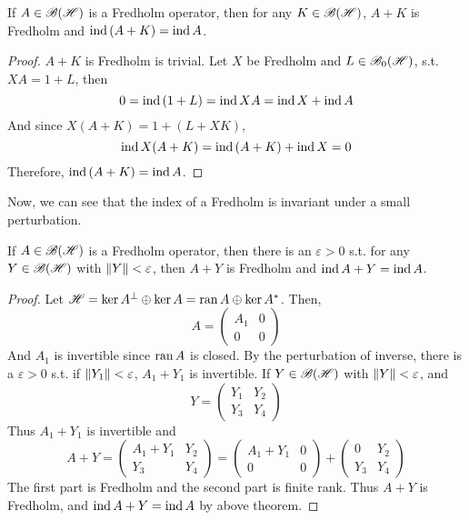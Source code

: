 \begin{thm}
	If $A \in \mathscr{B(H)}$ is a Fredholm operator, then for any $K \in \mathscr{B(H)}$, $A+K$ is Fredholm and $\operatorname{ind}{(A+K)} = \operatorname{ind}{A}$.
\end{thm}
\begin{proof}
	$A+K$ is Fredholm is trivial. Let $X$ be Fredholm and $L \in \mathscr{B}_{0}\mathscr{(H)}$, s.t. $XA = 1+L$, then
	\begin{equation*}
		0 = \operatorname{ind}{(1+L)} = \operatorname{ind}{XA} = \operatorname{ind}{X} + \operatorname{ind}{A}
	\end{equation*}
	And since $X(A+K) = 1+(L+XK)$, 
	\begin{equation*}
		\operatorname{ind}{X(A+K)} = \operatorname{ind}{(A+K)} + \operatorname{ind}{X} = 0
	\end{equation*}
	Therefore, $\operatorname{ind}{(A+K)} = \operatorname{ind}{A}$.
\end{proof}

Now, we can see that the index of a Fredholm is invariant under a small perturbation.

\begin{thm}
	If $A \in \mathscr{B(H)}$ is a Fredholm operator, then there is an $\varepsilon>0$ s.t. for any $Y \in \mathscr{B(H)}$ with $\left\lVert Y\right\lVert < \varepsilon$, then $A+Y$ is Fredholm and $\operatorname{ind}{A+Y} = \operatorname{ind}{A}$.
\end{thm}
\begin{proof}
	Let $\mathscr{H} = \ker{A}^{\bot} \oplus \ker{A} = \operatorname{ran}{A} \oplus \ker{A^{*}}$. Then,
	\begin{equation*}
		A = \left(
			\begin{array}{cc}
				A_1 & 0 \\
				0 & 0
			\end{array}
		\right)
	\end{equation*}
	And $A_1$ is invertible since $\operatorname{ran}{A}$ is closed. By the perturbation of inverse, there is a $\varepsilon > 0$ s.t. if $\left\lVert Y_1\right\lVert < \varepsilon$, $A_1+Y_1$ is invertible. If $Y \in \mathscr{B(H)}$ with $\left\lVert Y\right\lVert < \varepsilon$, and 
	\begin{equation*}
		Y = \left(
				\begin{array}{cc}
				Y_1 & Y_2 \\
				Y_3 & Y_4
				\end{array}
			\right)
	\end{equation*}
	Thus $A_1+Y_1$ is invertible and 
	\begin{equation*}
		A + Y =
		\left(
			\begin{array}{cc}
			A_1+Y_1 & Y_2 \\
			Y_3 & Y_4
			\end{array}
		\right)
		= 
		\left(
			\begin{array}{cc}
				A_1+Y_1 & 0 \\
				0 & 0
			\end{array}
		\right)
		+
		\left(
			\begin{array}{cc}
			0 & Y_2 \\
			Y_3 & Y_4
			\end{array}
		\right)
	\end{equation*}
	The first part is Fredholm and the second part is finite rank. Thus $A+Y$ is Fredholm, and $\operatorname{ind}{A+Y} = \operatorname{ind}{A}$ by above theorem.
\end{proof}

